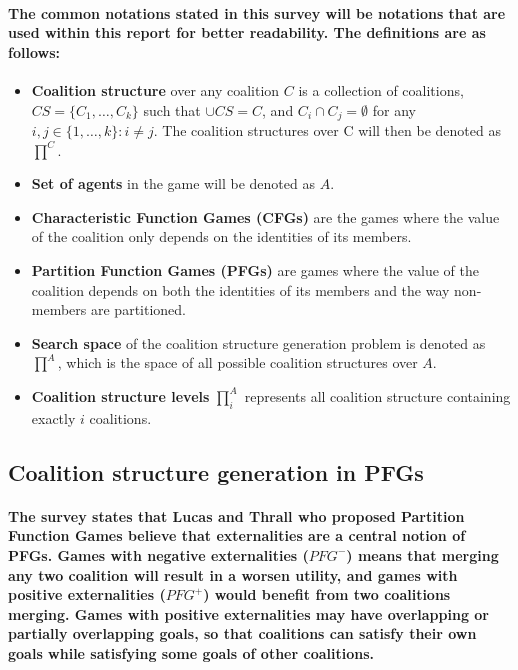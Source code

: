 \documentclass[11pt]{report}
\begin{document}
\paragraph{The common notations stated in this survey will be notations that are used within this report for better readability. The definitions are as follows: }

\begin{itemize}
	\item \textbf{Coalition structure} over any coalition $C$ is a collection of coalitions, $CS = \{C_1, \dotso ,C_k\}$ such that $\cup CS =C$, and $C_i \cap C_j=\emptyset$ for any $i, j \in \{1, \dotso, k\} : i \neq j$. The coalition structures over C will then be denoted as $\prod^C$. 
	\item \textbf{Set of agents} in the game will be denoted as $A$.
	\item \textbf{Characteristic Function Games (CFGs)} are the games where the value of the coalition only depends on the identities of its members. 
	\item \textbf{Partition Function Games (PFGs)} are games where the value of the coalition depends on both the identities of its members and the way non-members are partitioned.
	\item \textbf{Search space} of the coalition structure generation problem is denoted as $\prod^A$, which is the space of all possible coalition structures over $A$.  
	\item \textbf{Coalition structure levels} $\prod_i^A$ represents all coalition structure containing exactly $i$ coalitions. 

\end{itemize}

\subsection{Coalition structure generation in PFGs}
\paragraph{The survey states that Lucas and Thrall \cite{lucas1963partition} who proposed Partition Function Games believe that externalities are a central notion of PFGs. Games with negative externalities ($PFG^-$) means that merging any two coalition will result in a worsen utility, and games with positive externalities ($PFG^+$) would benefit from two coalitions merging. Games with positive externalities may have overlapping or partially overlapping goals, so that coalitions can satisfy their own goals while satisfying some goals of other coalitions. }
\end{document}
